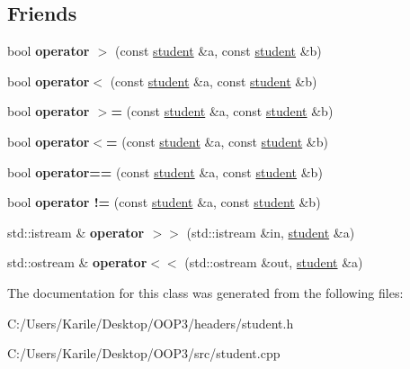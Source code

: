 \subsection*{Friends}
\begin{DoxyCompactItemize}
\item 
\mbox{\label{classstudent_aadf9c6be2b4ec3f3c2bca372453caaaa}} 
bool {\bfseries operator $>$} (const \mbox{\hyperlink{classstudent}{student}} \&a, const \mbox{\hyperlink{classstudent}{student}} \&b)
\item 
\mbox{\label{classstudent_ab3cfa082a55ba31a01674385be533ca2}} 
bool {\bfseries operator$<$} (const \mbox{\hyperlink{classstudent}{student}} \&a, const \mbox{\hyperlink{classstudent}{student}} \&b)
\item 
\mbox{\label{classstudent_a67074c3573b9a622cece1cd7409a375f}} 
bool {\bfseries operator $>$=} (const \mbox{\hyperlink{classstudent}{student}} \&a, const \mbox{\hyperlink{classstudent}{student}} \&b)
\item 
\mbox{\label{classstudent_adf4aed29727842c7c433af1072a66d78}} 
bool {\bfseries operator$<$=} (const \mbox{\hyperlink{classstudent}{student}} \&a, const \mbox{\hyperlink{classstudent}{student}} \&b)
\item 
\mbox{\label{classstudent_ad8325d0b883d0a6d8142d8134bc02b2d}} 
bool {\bfseries operator==} (const \mbox{\hyperlink{classstudent}{student}} \&a, const \mbox{\hyperlink{classstudent}{student}} \&b)
\item 
\mbox{\label{classstudent_ad87cdd087f4d379a5b711ade3d8f1713}} 
bool {\bfseries operator !=} (const \mbox{\hyperlink{classstudent}{student}} \&a, const \mbox{\hyperlink{classstudent}{student}} \&b)
\item 
\mbox{\label{classstudent_a2fa376a7fc76814e6d059b2c39f54fc7}} 
std\+::istream \& {\bfseries operator $>$$>$} (std\+::istream \&in, \mbox{\hyperlink{classstudent}{student}} \&a)
\item 
\mbox{\label{classstudent_a9468f1d4787e61f181467857d5998671}} 
std\+::ostream \& {\bfseries operator$<$$<$} (std\+::ostream \&out, \mbox{\hyperlink{classstudent}{student}} \&a)
\end{DoxyCompactItemize}


The documentation for this class was generated from the following files\+:\begin{DoxyCompactItemize}
\item 
C\+:/\+Users/\+Karile/\+Desktop/\+O\+O\+P3/headers/student.\+h\item 
C\+:/\+Users/\+Karile/\+Desktop/\+O\+O\+P3/src/student.\+cpp\end{DoxyCompactItemize}
